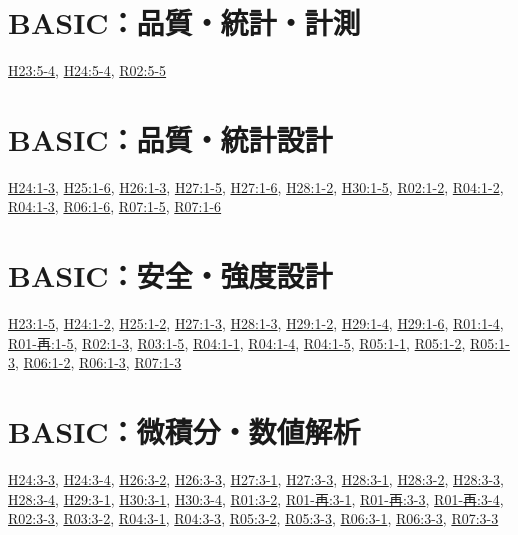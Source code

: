 \section{BASIC：品質・統計・計測}
\hyperref[q:h23-reg-basic-5-4]{H23:5-4}, \hyperref[q:h24-reg-basic-5-4]{H24:5-4}, \hyperref[q:r02-reg-basic-5-5]{R02:5-5}
\section{BASIC：品質・統計設計}
\hyperref[q:h24-reg-basic-1-3]{H24:1-3}, \hyperref[q:h25-reg-basic-1-6]{H25:1-6}, \hyperref[q:h26-reg-basic-1-3]{H26:1-3}, \hyperref[q:h27-reg-basic-1-5]{H27:1-5}, \hyperref[q:h27-reg-basic-1-6]{H27:1-6}, \hyperref[q:h28-reg-basic-1-2]{H28:1-2}, \hyperref[q:h30-reg-basic-1-5]{H30:1-5}, \hyperref[q:r02-reg-basic-1-2]{R02:1-2}, \hyperref[q:r04-reg-basic-1-2]{R04:1-2}, \hyperref[q:r04-reg-basic-1-3]{R04:1-3}, \hyperref[q:r06-reg-basic-1-6]{R06:1-6}, \hyperref[q:r07-reg-basic-1-5]{R07:1-5}, \hyperref[q:r07-reg-basic-1-6]{R07:1-6}
\section{BASIC：安全・強度設計}
\hyperref[q:h23-reg-basic-1-5]{H23:1-5}, \hyperref[q:h24-reg-basic-1-2]{H24:1-2}, \hyperref[q:h25-reg-basic-1-2]{H25:1-2}, \hyperref[q:h27-reg-basic-1-3]{H27:1-3}, \hyperref[q:h28-reg-basic-1-3]{H28:1-3}, \hyperref[q:h29-reg-basic-1-2]{H29:1-2}, \hyperref[q:h29-reg-basic-1-4]{H29:1-4}, \hyperref[q:h29-reg-basic-1-6]{H29:1-6}, \hyperref[q:r01-reg-basic-1-4]{R01:1-4}, \hyperref[q:r01-ret-basic-1-5]{R01-再:1-5}, \hyperref[q:r02-reg-basic-1-3]{R02:1-3}, \hyperref[q:r03-reg-basic-1-5]{R03:1-5}, \hyperref[q:r04-reg-basic-1-1]{R04:1-1}, \hyperref[q:r04-reg-basic-1-4]{R04:1-4}, \hyperref[q:r04-reg-basic-1-5]{R04:1-5}, \hyperref[q:r05-reg-basic-1-1]{R05:1-1}, \hyperref[q:r05-reg-basic-1-2]{R05:1-2}, \hyperref[q:r05-reg-basic-1-3]{R05:1-3}, \hyperref[q:r06-reg-basic-1-2]{R06:1-2}, \hyperref[q:r06-reg-basic-1-3]{R06:1-3}, \hyperref[q:r07-reg-basic-1-3]{R07:1-3}
\section{BASIC：微積分・数値解析}
\hyperref[q:h24-reg-basic-3-3]{H24:3-3}, \hyperref[q:h24-reg-basic-3-4]{H24:3-4}, \hyperref[q:h26-reg-basic-3-2]{H26:3-2}, \hyperref[q:h26-reg-basic-3-3]{H26:3-3}, \hyperref[q:h27-reg-basic-3-1]{H27:3-1}, \hyperref[q:h27-reg-basic-3-3]{H27:3-3}, \hyperref[q:h28-reg-basic-3-1]{H28:3-1}, \hyperref[q:h28-reg-basic-3-2]{H28:3-2}, \hyperref[q:h28-reg-basic-3-3]{H28:3-3}, \hyperref[q:h28-reg-basic-3-4]{H28:3-4}, \hyperref[q:h29-reg-basic-3-1]{H29:3-1}, \hyperref[q:h30-reg-basic-3-1]{H30:3-1}, \hyperref[q:h30-reg-basic-3-4]{H30:3-4}, \hyperref[q:r01-reg-basic-3-2]{R01:3-2}, \hyperref[q:r01-ret-basic-3-1]{R01-再:3-1}, \hyperref[q:r01-ret-basic-3-3]{R01-再:3-3}, \hyperref[q:r01-ret-basic-3-4]{R01-再:3-4}, \hyperref[q:r02-reg-basic-3-3]{R02:3-3}, \hyperref[q:r03-reg-basic-3-2]{R03:3-2}, \hyperref[q:r04-reg-basic-3-1]{R04:3-1}, \hyperref[q:r04-reg-basic-3-3]{R04:3-3}, \hyperref[q:r05-reg-basic-3-2]{R05:3-2}, \hyperref[q:r05-reg-basic-3-3]{R05:3-3}, \hyperref[q:r06-reg-basic-3-1]{R06:3-1}, \hyperref[q:r06-reg-basic-3-3]{R06:3-3}, \hyperref[q:r07-reg-basic-3-3]{R07:3-3}
